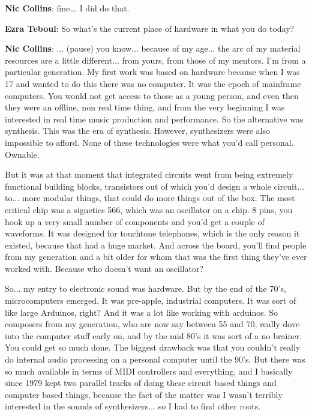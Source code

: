 \textbf{Nic Collins}: fine... I did do that.

\textbf{Ezra Teboul}: So what’s the current place of hardware in what you do today?
					
\textbf{Nic Collins}: ... (pause) you know... because of my age... the arc of my material resources are a little different... from yours, from those of my mentors. I’m from a particular generation. My first work was based on hardware because when I was 17 and wanted to do this there was no computer. It was the epoch of mainframe computers. You would not get access to those as a young person, and even then they were an offline, non real time thing, and from the very beginning I was interested in real time music production and performance. So the alternative was synthesis. This was the era of synthesis. However, synthesizers were also impossible to afford. None of these technologies were what you’d call personal. Ownable.
					
But it was at that moment that integrated circuits went from being extremely functional building blocks, transistors out of which you’d design a whole circuit... to... more modular things, that could do more things out of the box. The most critical chip was a signetics 566, which was an oscillator on a chip. 8 pins, you hook up a very small number of components and you’d get a couple of waveforms. It was designed for touchtone telephones, which is the only reason it existed, because that had a huge market. And across the board, you’ll find people from my generation and a bit older for whom that was the first thing they’ve ever worked with. Because who doesn’t want an oscillator?
					
So... my entry to electronic sound was hardware. But by the end of the 70’s, microcomputers emerged. It was pre-apple, industrial computers. It was sort of like large Arduinos, right? And it was a lot like working with arduinos. So composers from my generation, who are now say between 55 and 70, really dove into the computer stuff early on, and by the mid 80’s it was sort of a no brainer. You could get so much done. The biggest drawback was that you couldn’t really do internal audio processing on a personal computer until the 90’s. But there was so much available in terms of MIDI controllers and everything, and I basically since 1979 kept two parallel tracks of doing these circuit based things and computer based things, because the fact of the matter was I wasn’t terribly interested in the sounds of synthesizers... so I had to find other roots.
					
